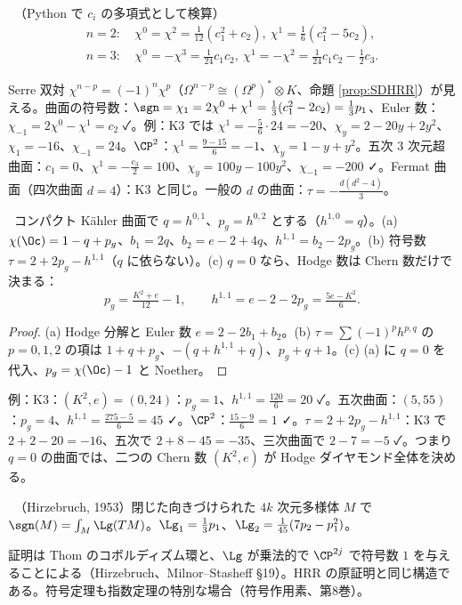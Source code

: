 \begin{thm}[低次元の公式]\label{thm:chiylow}\tP\ （Python で $c_i$ の多項式として検算）
\begin{align*}
n=2:&\ \chi^0=\chi^2=\tfrac1{12}(c_1^2+c_2),\ \chi^1=\tfrac16(c_1^2-5c_2),\\
n=3:&\ \chi^0=-\chi^3=\tfrac1{24}c_1c_2,\ \chi^1=-\chi^2=\tfrac1{24}c_1c_2-\tfrac12c_3.
\end{align*}
\end{thm}
\noindent Serre 双対 $\chi^{n-p}=(-1)^n\chi^p$（$\Omega^{n-p}\cong(\Omega^p)^*\otimes K$、命題 \ref{prop:SDHRR}）が見える。曲面の符号数：$\sgn=\chi_1=2\chi^0+\chi^1=\frac13(c_1^2-2c_2)=\frac13p_1$、Euler 数：$\chi_{-1}=2\chi^0-\chi^1=c_2$ ✓。例：K3 では $\chi^1=-\frac56\cdot24=-20$、$\chi_y=2-20y+2y^2$、$\chi_1=-16$、$\chi_{-1}=24$。$\CP^2$：$\chi^1=\frac{9-15}6=-1$、$\chi_y=1-y+y^2$。五次 3 次元超曲面：$c_1=0$、$\chi^1=-\frac{c_3}2=100$、$\chi_y=100y-100y^2$、$\chi_{-1}=-200$ ✓。Fermat 曲面（四次曲面 $d=4$）：K3 と同じ。一般の $d$ の曲面：$\tau=-\frac{d(d^2-4)}3$。


\begin{prop}\label{prop:hodgesurf}\tP\
コンパクト Kähler 曲面で $q=h^{0,1}$、$p_g=h^{0,2}$ とする（$h^{1,0}=q$）。(a) $\chi(\Oc)=1-q+p_g$、$b_1=2q$、$b_2=e-2+4q$、$h^{1,1}=b_2-2p_g$。(b) 符号数 $\tau=2+2p_g-h^{1,1}$（$q$ に依らない）。(c) $q=0$ なら、Hodge 数は Chern 数だけで決まる：
\[
p_g=\tfrac{K^2+e}{12}-1,\qquad h^{1,1}=e-2-2p_g=\tfrac{5e-K^2}{6}.
\]
\end{prop}
\begin{proof}
(a) Hodge 分解と Euler 数 $e=2-2b_1+b_2$。(b) $\tau=\sum(-1)^ph^{p,q}$ の $p=0,1,2$ の項は $1+q+p_g$、$-(q+h^{1,1}+q)$、$p_g+q+1$。(c) (a) に $q=0$ を代入、$p_g=\chi(\Oc)-1$ と Noether。
\end{proof}
\noindent 例：K3：$(K^2,e)=(0,24)$：$p_g=1$、$h^{1,1}=\frac{120}6=20$ ✓。五次曲面：$(5,55)$：$p_g=4$、$h^{1,1}=\frac{275-5}6=45$ ✓。$\CP^2$：$\frac{15-9}6=1$ ✓。$\tau=2+2p_g-h^{1,1}$：K3 で $2+2-20=-16$、五次で $2+8-45=-35$、三次曲面で $2-7=-5$ ✓。つまり $q=0$ の曲面では、二つの Chern 数 $(K^2,e)$ が Hodge ダイヤモンド全体を決める。

\begin{thm}[符号定理]\label{thm:sign}\tC\ （Hirzebruch, 1953）閉じた向きづけられた $4k$ 次元多様体 $M$ で $\sgn(M)=\int_M\Lg(TM)$。$\Lg_1=\frac13p_1$、$\Lg_2=\frac1{45}(7p_2-p_1^2)$。
\end{thm}
\noindent 証明は Thom のコボルディズム環と、$\Lg$ が乗法的で $\CP^{2j}$ で符号数 $1$ を与えることによる（Hirzebruch、Milnor--Stasheff §19）。HRR の原証明と同じ構造である。符号定理も指数定理の特別な場合（符号作用素、第8巻）。

